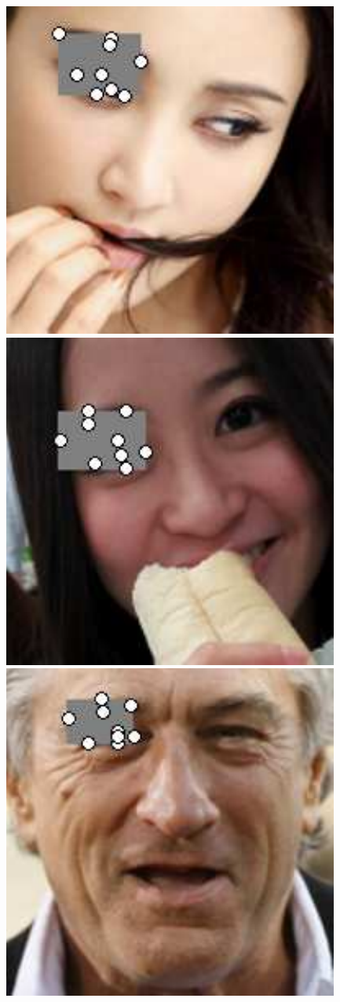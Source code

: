 \documentclass[journal]{IEEEtran}
\begin{document}
\begin{figure}[!htb]
\centering
\includegraphics[scale=0.25]{6_occlu}
\includegraphics[scale=0.25]{86_occlu}
\includegraphics[scale=0.25]{99_occlu}

\end{figure}
\end{document}

